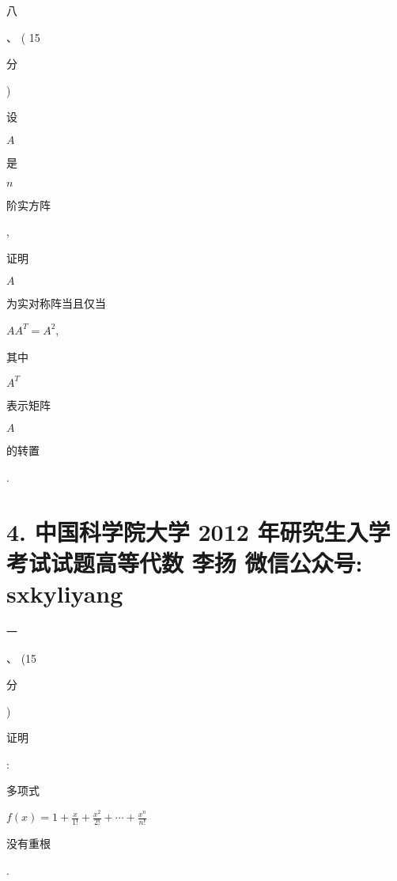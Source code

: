 \documentclass[10pt]{article}
\begin{document}
\begin{CJK}{UTF8}{mj}八\end{CJK}、 ( 15 \begin{CJK}{UTF8}{mj}分\end{CJK}) \begin{CJK}{UTF8}{mj}设\end{CJK} $A$ \begin{CJK}{UTF8}{mj}是\end{CJK} $n$ \begin{CJK}{UTF8}{mj}阶实方阵\end{CJK}, \begin{CJK}{UTF8}{mj}证明\end{CJK} $A$ \begin{CJK}{UTF8}{mj}为实对称阵当且仅当\end{CJK} $A A^{T}=A^{2}$, \begin{CJK}{UTF8}{mj}其中\end{CJK} $A^{T}$ \begin{CJK}{UTF8}{mj}表示矩阵\end{CJK} $A$ \begin{CJK}{UTF8}{mj}的转置\end{CJK}.

\section{4. 中国科学院大学 2012 年研究生入学考试试题高等代数 
 李扬 
 微信公众号: sxkyliyang}
\begin{CJK}{UTF8}{mj}一\end{CJK}、 (15 \begin{CJK}{UTF8}{mj}分\end{CJK}) \begin{CJK}{UTF8}{mj}证明\end{CJK}: \begin{CJK}{UTF8}{mj}多项式\end{CJK} $f(x)=1+\frac{x}{1 !}+\frac{x^{2}}{2 !}+\cdots+\frac{x^{n}}{n !}$ \begin{CJK}{UTF8}{mj}没有重根\end{CJK}.
\end{document}
